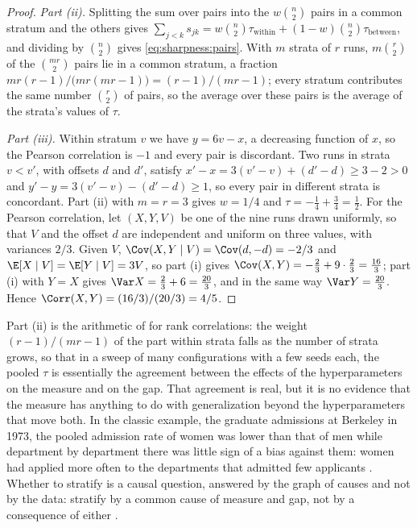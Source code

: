 \begin{refsection}
\begin{proof}
\emph{Part (ii).} Splitting the sum over pairs into the $w\binom n2$ pairs in a common stratum and the others gives $\sum_{j<k}s_{jk}=w\binom n2\tau_{\mathrm{within}}+(1-w)\binom n2\tau_{\mathrm{between}}$, and dividing by $\binom n2$ gives \eqref{eq:sharpness:pairs}. With $m$ strata of $r$ runs, $m\binom r2$ of the $\binom{mr}2$ pairs lie in a common stratum, a fraction $mr(r-1)/\bigl(mr(mr-1)\bigr)=(r-1)/(mr-1)$; every stratum contributes the same number $\binom r2$ of pairs, so the average over these pairs is the average of the strata's values of $\tau$.

\emph{Part (iii).} Within stratum $v$ we have $y=6v-x$, a decreasing function of $x$, so the Pearson correlation is $-1$ and every pair is discordant. Two runs in strata $v<v'$, with offsets $d$ and $d'$, satisfy $x'-x=3(v'-v)+(d'-d)\ge3-2>0$ and $y'-y=3(v'-v)-(d'-d)\ge1$, so every pair in different strata is concordant. Part (ii) with $m=r=3$ gives $w=1/4$ and $\tau=-\frac14+\frac34=\frac12$. For the Pearson correlation, let $(X,Y,V)$ be one of the nine runs drawn uniformly, so that $V$ and the offset $d$ are independent and uniform on three values, with variances $2/3$. Given $V$, $\Cov(X,Y\mid V)=\Cov(d,-d)=-2/3$ and $\E[X\mid V]=\E[Y\mid V]=3V$, so part (i) gives $\Cov(X,Y)=-\frac23+9\cdot\frac23=\frac{16}3$; part (i) with $Y=X$ gives $\Var X=\frac23+6=\frac{20}3$, and in the same way $\Var Y=\frac{20}3$. Hence $\Corr(X,Y)=(16/3)/(20/3)=4/5$.
\end{proof}

Part (ii) is the arithmetic of  \parencite{Simpson1951} for rank correlations: the weight $(r-1)/(mr-1)$ of the part within strata falls as the number of strata grows, so that in a sweep of many configurations with a few seeds each, the pooled $\tau$ is essentially the agreement between the effects of the hyperparameters on the measure and on the gap. That agreement is real, but it is no evidence that the measure has anything to do with generalization beyond the hyperparameters that move both. In the classic example, the graduate admissions at Berkeley in 1973, the pooled admission rate of women was lower than that of men while department by department there was little sign of a bias against them: women had applied more often to the departments that admitted few applicants \parencite{BickelHammelOConnell1975}. Whether to stratify is a causal question, answered by the graph of causes and not by the data: stratify by a common cause of measure and gap, not by a consequence of either \parencite{Pearl2009}.


\end{refsection}
